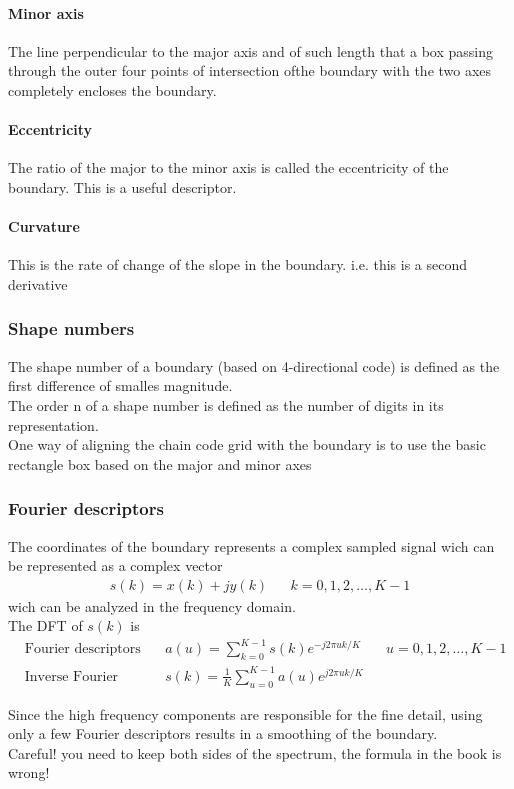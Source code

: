\paragraph{Minor axis}
The line perpendicular to the major axis and of such length that a box passing through the outer four points of intersection ofthe boundary with the two axes completely encloses the boundary.
\paragraph{Eccentricity}
The ratio of the major to the minor axis is called the eccentricity of the boundary. This is a useful descriptor.
\paragraph{Curvature}
This is the rate of change of the slope in the boundary. i.e. this is a second derivative
\subsubsection{Shape numbers}
The shape number of a boundary (based on 4-directional code) is defined as the first difference of smalles magnitude.\\
The order n of a shape number is defined as the number of digits in its representation.\\
One way of aligning the chain code grid with the boundary is to use the basic rectangle box based on the major and minor axes\\
\subsubsection{Fourier descriptors}
The coordinates of the boundary represents a complex sampled signal wich can be represented as a complex vector 
\begin{align*}
s(k)=x(k)+jy(k) && k=0,1,2,\ldots,K-1
\end{align*} 
wich can be analyzed in the frequency domain.\\
The DFT of $s(k)$ is \begin{align*}
& \text{Fourier descriptors of the boundary:} && a(u)=\sum\limits_{k=0}^{K-1}s(k)e^{-j2\pi uk/K} && u=0,1,2,\ldots,K-1\\
& \text{Inverse Fourier transform:} && s(k)=\frac{1}{K}\sum\limits_{u=0}^{K-1}a(u)e^{j2\pi uk/K}
\end{align*} 

Since the high frequency components are responsible for the fine detail, using only a few Fourier descriptors results in a smoothing of the boundary.\\
Careful! you need to keep both sides of the spectrum, the formula in the book is wrong!\\

